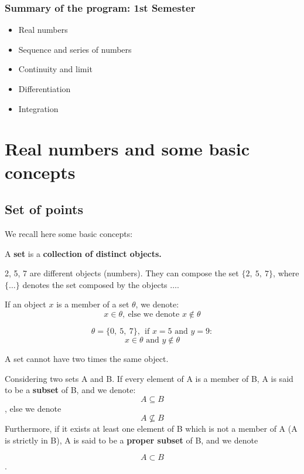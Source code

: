 \documentclass[12pt, a4paper]{book}
\begin{document}
\subsection*{Summary of the program: 1st Semester}
\begin{itemize}
  \item Real numbers
  \item Sequence and series of numbers
  \item Continuity and limit
  \item Differentiation
  \item Integration
\end{itemize}

\chapter{Real numbers and some basic concepts}

\section{Set of points}
We recall here some basic concepts:
\begin{defn}
  A \textbf{set} is a \textbf{collection of distinct objects.}
\end{defn}
\begin{exmp}
  2, 5, 7 are different objects (numbers). They can compose the set $\{2, \ 5, \ 7 \}$, where $\{ \ldots \}$ denotes the
  set composed by the objects $\ldots$.
\end{exmp}

\begin{note}
  If an object $x$ is a member of a set $\theta$, we denote: 
  $$ x \in \theta, \ \text{else we denote } x \notin \theta$$

  \begin{exmp}
    \[
      \theta = \{0, \ 5, \ 7 \}, \ \ \text{if }x=5 \text{ and } y=9:
    \]
    \[
      x \in \theta \text{ and } y \notin \theta
    \]
  \end{exmp}
\end{note}

\begin{rem}
  A set cannot have two times the same object.
\end{rem}

\begin{defn}
  Considering two sets A and B. If every element of A is a member of B, A is said to be a \textbf{subset} of B, and we denote:
  \boldmath $$ A \subseteq B$$, else we denote 
  $$ A \nsubseteq B $$ 
  Furthermore, if it exists at least one element of B which is not a member of A (A is strictly in B), A is said to be a \textbf{proper subset} of B, and we denote

  $$ A \subset B $$. \unboldmath
  
\end{defn}
\end{document}
